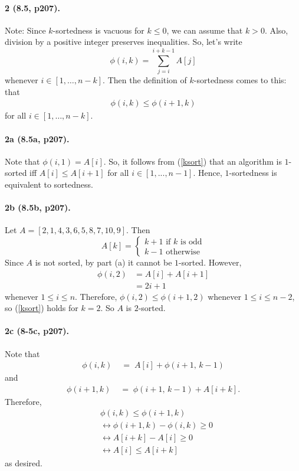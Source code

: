 \documentclass[
]{article}
\begin{document}
\paragraph{2 (8.5, p207).} Note: Since $k$-sortedness is vacuous for $k\leq 0$, we can assume that $k>0$.  Also, division by a positive integer preserves inequalities.  So, let's write
\[
\phi(i, k) = \sum_{j=i}^{i+k-1}A[j]
\]
whenever $i\in [1,\ldots, n - k]$.  
Then the definition of $k$-sortedness comes to this:
that
\begin{align}
  \label{ksort}
\phi(i, k)\leq \phi(i+1, k)
\end{align}
 for all $i\in [1,\ldots, n-k]$.

\paragraph{2a (8.5a, p207).} 
Note that $\phi(i, 1) = A[i]$.  So, it follows from (\ref{ksort}) that an algorithm is $1$-sorted iff $A[i]\leq A[i+1]$ for all $i\in [1,...,n-1]$.  Hence, $1$-sortedness is equivalent to sortedness.

\paragraph{2b (8.5b, p207).} Let 
$A = [2,1,4,3,6,5,8,7,10,9]$.
Then 
\begin{equation*}
A[k] = 
\begin{cases}
  k+1\text{ if $k$ is odd}
  \\
  k-1\text{ otherwise}
\end{cases}
\end{equation*}
Since $A$ is not sorted, by part (a) it cannot be $1$-sorted.
However,
\begin{align*}
\phi(i, 2) &= A[i]+A[i+1]\\ &= 2i+1  
\end{align*}
whenever $1\leq i\leq n$.  Therefore, $\phi(i,2)\leq \phi(i+1, 2)$ whenever $1\leq i\leq n-2$, so (\ref{ksort}) holds for $k=2$.  So $A$ is $2$-sorted.  

\paragraph{2c (8-5c, p207).} 
Note that
\begin{align*}
\phi(i, k) &\;=\; A[i] + \phi(i+1,\, k-1)
\end{align*}
and 
\begin{align*}
\phi(i+1, k)&\;=\;\phi(i+1,\, k-1)+A[i+k].
\end{align*}
Therefore,
\begin{align*}
&\phi(i, k)\leq \phi(i+1, k)\\
&\leftrightarrow
\phi(i+1, k) - \phi(i, k) \geq 0\\
&\leftrightarrow
A[i+k] - A[i] \geq 0\\
&\leftrightarrow
A[i]\leq A[i+k]
\end{align*} as desired.
\end{document}
